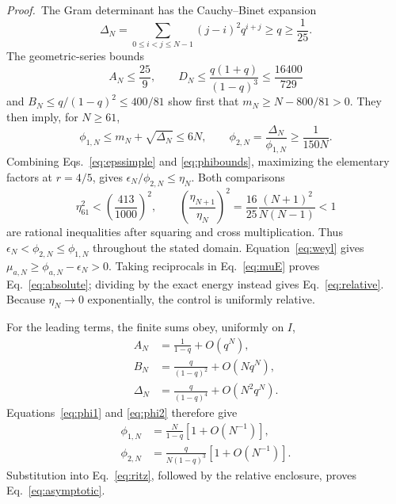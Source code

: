 \documentclass[aps,prb,reprint,superscriptaddress,longbibliography]{revtex4-2}
\begin{document}
\noindent\textit{Proof.}\ 
The Gram determinant has the Cauchy--Binet expansion
\begin{equation}
 \Delta_N=\sum_{0\leq i<j\leq N-1}(j-i)^2q^{i+j}
 \geq q\geq\frac1{25}.
 \label{eq:CB}
\end{equation}
The geometric-series bounds
\begin{equation}
 A_N\leq\frac{25}{9},\qquad
 D_N\leq\frac{q(1+q)}{(1-q)^3}\leq\frac{16400}{729}
\end{equation}
and $B_N\leq q/(1-q)^2\leq400/81$ show first that
$m_N\geq N-800/81>0$.  They then imply, for $N\geq61$,
\begin{equation}
 \phi_{1,N}\leq m_N+\sqrt{\Delta_N}\leq6N,\qquad
 \phi_{2,N}=\frac{\Delta_N}{\phi_{1,N}}\geq\frac{1}{150N}.
 \label{eq:phibounds}
\end{equation}
Combining Eqs.~\eqref{eq:epssimple} and \eqref{eq:phibounds}, maximizing the
elementary factors at $r=4/5$, gives
$\epsilon_N/\phi_{2,N}\leq\eta_N$.  Both comparisons
\begin{equation}
 \eta_{61}^2<\left(\frac{413}{1000}\right)^2,
 \qquad
 \left(\frac{\eta_{N+1}}{\eta_N}\right)^2
 =\frac{16}{25}\frac{(N+1)^2}{N(N-1)}<1
 \label{eq:etaexact}
\end{equation}
are rational inequalities after squaring and cross multiplication.  Thus
$\epsilon_N<\phi_{2,N}\leq\phi_{1,N}$ throughout the stated domain.
Equation~\eqref{eq:weyl} gives
$\mu_{a,N}\geq\phi_{a,N}-\epsilon_N>0$.  Taking reciprocals in
Eq.~\eqref{eq:muE} proves Eq.~\eqref{eq:absolute}; dividing by the exact
energy instead gives Eq.~\eqref{eq:relative}.  Because $\eta_N\to0$
exponentially, the control is uniformly relative.

For the leading terms, the finite sums obey, uniformly on $I$,
\begin{align}
 A_N&=\frac1{1-q}+O(q^N),\nonumber\\
 B_N&=\frac{q}{(1-q)^2}+O(Nq^N),\nonumber\\
 \Delta_N&=\frac{q}{(1-q)^4}+O(N^2q^N).
 \label{eq:sumasy}
\end{align}
Equations~\eqref{eq:phi1} and \eqref{eq:phi2} therefore give
\begin{align}
 \phi_{1,N}&=\frac{N}{1-q}[1+O(N^{-1})],\nonumber\\
 \phi_{2,N}&=\frac{q}{N(1-q)^3}[1+O(N^{-1})].
 \label{eq:phiasy}
\end{align}
Substitution into Eq.~\eqref{eq:ritz}, followed by the relative enclosure,
proves Eq.~\eqref{eq:asymptotic}.
\end{document}
